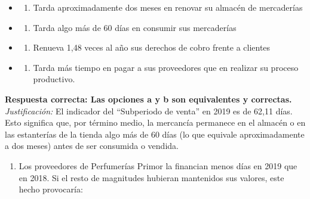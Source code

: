 \documentclass[12pt]{book} %
\providecommand{\tightlist}{%
  \setlength{\itemsep}{0pt}\setlength{\parskip}{0pt}}
\begin{document}
\begin{itemize}
\item
  \begin{enumerate}
  \def\labelenumi{\alph{enumi})}
  \tightlist
  \item
    Tarda aproximadamente dos meses en renovar su almacén de mercaderías
  \end{enumerate}
\item
  \begin{enumerate}
  \def\labelenumi{\alph{enumi})}
  \setcounter{enumi}{1}
  \tightlist
  \item
    Tarda algo más de 60 días en consumir sus mercaderías
  \end{enumerate}
\item
  \begin{enumerate}
  \def\labelenumi{\alph{enumi})}
  \setcounter{enumi}{2}
  \tightlist
  \item
    Renueva 1,48 veces al año sus derechos de cobro frente a clientes
  \end{enumerate}
\item
  \begin{enumerate}
  \def\labelenumi{\alph{enumi})}
  \setcounter{enumi}{3}
  \tightlist
  \item
    Tarda más tiempo en pagar a sus proveedores que en realizar su
    proceso productivo.
  \end{enumerate}
\end{itemize}

\textbf{Respuesta correcta: Las opciones a y b son equivalentes y
correctas.} \emph{Justificación:} El indicador del ``Subperiodo de
venta'' en 2019 es de 62,11 días. Esto significa que, por término medio,
la mercancía permanece en el almacén o en las estanterías de la tienda
algo más de 60 días (lo que equivale aproximadamente a dos meses) antes
de ser consumida o vendida.

\begin{enumerate}
\def\labelenumi{\arabic{enumi}.}
\setcounter{enumi}{4}
\tightlist
\item
  Los proveedores de Perfumerías Primor la financian menos días en 2019
  que en 2018. Si el resto de magnitudes hubieran mantenidos sus
  valores, este hecho provocaría:
\end{enumerate}
\end{document}
